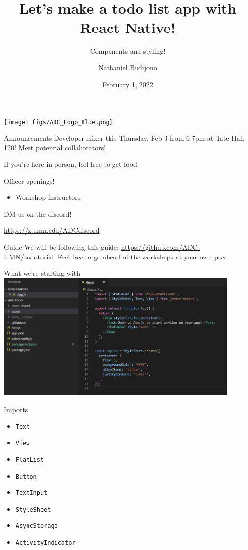 \documentclass{beamer}
\title{Let's make a todo list app with React Native!}
\subtitle{Components and styling!}
\author{Nathaniel Budijono}
\date{February 1, 2022}
\institute{UMN ADC}
\begin{document}
\begin{frame}
    \titlepage
    \texttt{[image: figs/ADC\_Logo\_Blue.png]}
\end{frame}

\begin{frame}{Announcements}
	Developer mixer this Thursday, Feb 3 from 6-7pm at Tate Hall 120! Meet potential collaborators!

	\bigskip

	If you're here in person, feel free to get food!	
\end{frame}

\begin{frame}{Officer openings!}
	\begin{itemize}
		\item Workshop instructors
	\end{itemize}

	\bigskip

	DM us on the discord!

	\bigskip

	\href{https://z.umn.edu/ADCdiscord}{https://z.umn.edu/ADCdiscord}
\end{frame}

\begin{frame}{Guide}
	We will be following this guide: \href{https://github.com/ADC-UMN/todotorial}{https://github.com/ADC-UMN/todotorial}. Feel free to go ahead of the workshops at your own pace.
\end{frame}

\begin{frame}{What we're starting with}
	\centering
	\includegraphics[width=0.9\textwidth]{figs/expo-blank.png}	
\end{frame}

\begin{frame}{Imports}
	\begin{itemize}
		\item \texttt{Text}
		\item \texttt{View}
		\item \texttt{FlatList}
		\item \texttt{Button}
		\item \texttt{TextInput}
		\item \texttt{StyleSheet}
		\item \texttt{AsyncStorage}
		\item \texttt{ActivityIndicator}
	\end{itemize}
\end{frame}
\end{document}
